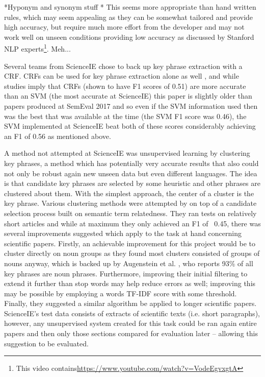 *Hyponym and synonym stuff * This seems more appropriate than hand written rules, which may seem appealing as they can be somewhat tailored and provide high accuracy, but require much more effort from the developer and may not work well on unseen conditions providing low accuracy as discussed by Stanford NLP experts\footnote{This video contains\href{https://www.youtube.com/watch?v=VodeEgvxgtA}{https://www.youtube.com/watch?v=VodeEgvxgtA}}. Meh...

Several teams from ScienceIE chose to back up key phrase extraction with a CRF. CRFs can be used for key phrase extraction alone as well \cite{Zhang2008}, and while studies imply that CRFs (shown to have F1 scores of 0.51) are more accurate than an SVM (the most accurate at ScienceIE) this paper is slightly older than papers produced at SemEval 2017 and so even if the SVM information used then was the best that was available at the time (the SVM F1 score was 0.46), the SVM implemented at ScienceIE beat both of these scores considerably achieving an F1 of 0.56 as mentioned above.

A method not attempted at ScienceIE was unsupervised learning by clustering key phrases, a method which has potentially very accurate results that also could not only be robust again new unseen data but even different languages. The idea is that candidate key phrases are selected by some heuristic and other phrases are clustered about them. With the simplest approach, the center of a cluster is the key phrase. Various clustering methods were attempted by \cite{Liu2009} on top of a candidate selection process built on semantic term relatedness. They ran tests on relatively short articles and while at maximum they only achieved an F1 of ~0.45, there was several improvements suggested which apply to the task at hand concerning scientific papers. Firstly, an achievable improvement for this project would be to cluster directly on noun groups as they found most clusters consisted of groups of nouns anyway, which is backed up by Augenstein et al. \cite{Augenstein2017}, who reports 93\% of all key phrases are noun phrases. Furthermore, improving their initial filtering to extend it further than stop words may help reduce errors as well; improving this may be possible by employing a words TF-IDF score with some threshold. Finally, they suggested a similar algorithm be applied to longer scientific papers. ScienceIE’s test data consists of extracts of scientific texts (i.e. short paragraphs), however, any unsupervised system created for this task could be ran again entire papers and then only those sections compared for evaluation later – allowing this suggestion to be evaluated.

